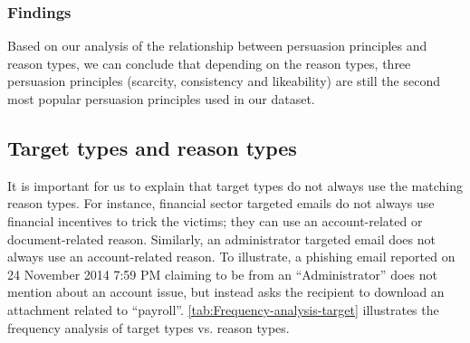 \subsubsection{\label{sub:Finding-1}Findings}

Based on our analysis of the relationship between persuasion principles
and reason types, we can conclude that depending on the reason types,
three persuasion principles (scarcity, consistency and likeability)
are still the second most popular persuasion principles used in our
dataset.


\subsection{Target types and reason types}

It is important for us to explain that target types do not always
use the matching reason types. For instance, financial sector targeted
emails do not always use financial incentives to trick the victims;
they can use an account-related or document-related reason. Similarly,
an administrator targeted email does not always use an account-related
reason. To illustrate, a phishing email reported on 24 November 2014
7:59 PM claiming to be from an \textquotedblleft Administrator\textquotedblright{}
does not mention about an account issue, but instead asks the recipient
to download an attachment related to \textquotedblleft payroll\textquotedblright .
\autoref{tab:Frequency-analysis-target} illustrates the frequency
analysis of target types vs. reason types. 

